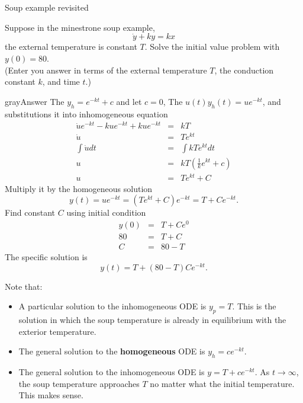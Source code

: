 \begin{exercise}
  Soup example revisited
\end{exercise}
Suppose in the minestrone soup example,
\begin{equation*}
  \dot{y} + ky = kx 
\end{equation*}
the external temperature is constant $T$.
Solve the initial value problem with $y(0) = 80$.\\
(Enter you answer in terms of the external temperature $T$,
the conduction constant $k$, and time $t$.)
\begin{mybox}{gray}{Answer}
  The $y_h = e^{-kt} + c$ and let $c = 0$,
  The $u(t)y_h(t) = ue^{-kt}$, and substitutions it into inhomogeneous equation
  \begin{eqnarray*}
    \dot{u}e^{-kt} -kue^{-kt} + kue^{-kt} &=& kT\\
    \dot{u} &=& Te^{kt} \\
    \int \dot{u} dt &=& \int kTe^{kt} dt \\
    u &=& kT(\frac{1}{k}e^{kt} + c) \\
    u &=& Te^{kt} + C
  \end{eqnarray*}
  Multiply it by the homogeneous solution
  \begin{equation*}
    y(t) = ue^{-kt} = (Te^{kt} + C)e^{-kt} = T + Ce^{-kt}.
  \end{equation*}
  Find constant $C$ using initial condition
  \begin{eqnarray*}
    y(0)  &=& T + Ce^{0}\\
    80 &=& T + C\\
    C &=& 80 - T     
  \end{eqnarray*}
  The specific solution is
  \begin{equation*}
    y(t) = T + (80 - T)Ce^{-kt}.
  \end{equation*}

  Note that:
  \begin{itemize}
  \item A particular solution to the inhomogeneous ODE is $y_p=T$.
    This is the solution in which the soup temperature is already in equilibrium with the exterior temperature.
  \item The general solution to the \textbf{homogeneous} ODE is $y_h=ce^{−kt}$.
  \item The general solution to the inhomogeneous ODE is
    $y = T+ ce^{−kt}$. As $t \rightarrow \infty$,
    the soup temperature approaches $T$ no matter what the initial temperature. This makes sense.    
  \end{itemize}
\end{mybox}
\clearpage

